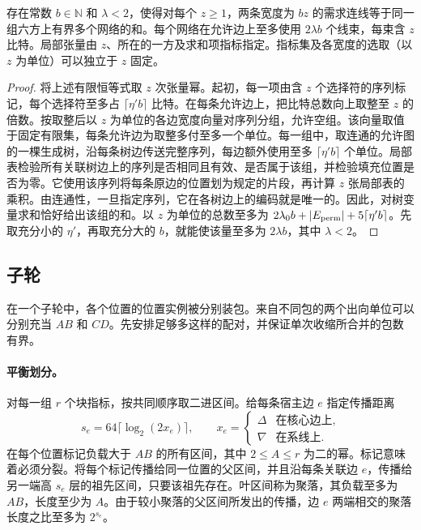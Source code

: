 \begin{lemma}[宽度的固定选择]\label{lem:powered-gadget} 存在常数 $b\in\mathbb N$ 和 $\lambda<2$，使得对每个 $z\ge1$，两条宽度为 $bz$ 的需求连线等于同一组六方上有界多个网络的和。每个网络在允许边上至多使用 $2\lambda b$ 个线束，每束含 $z$ 比特。局部张量由 $z$、所在的一方及求和项指标指定。指标集及各宽度的选取（以 $z$ 为单位）可以独立于 $z$ 固定。\end{lemma}

\begin{proof} 将上述有限恒等式取 $z$ 次张量幂。起初，每一项由含 $z$ 个选择符的序列标记，每个选择符至多占 $\lceil\eta'b\rceil$ 比特。在每条允许边上，把比特总数向上取整至 $z$ 的倍数。按取整后以 $z$ 为单位的各边宽度向量对序列分组，允许空组。该向量取值于固定有限集，每条允许边为取整多付至多一个单位。每一组中，取连通的允许图的一棵生成树，沿每条树边传送完整序列，每边额外使用至多 $\lceil\eta'b\rceil$ 个单位。局部表检验所有关联树边上的序列是否相同且有效、是否属于该组，并检验填充位置是否为零。它使用该序列将每条原边的位置划为规定的片段，再计算 $z$ 张局部表的乘积。由连通性，一旦指定序列，它在各树边上的编码就是唯一的。因此，对树变量求和恰好给出该组的和。以 $z$ 为单位的总数至多为 $2\lambda_0 b+|E_{\rm perm}|+5\lceil\eta'b\rceil$。先取充分小的 $\eta'$，再取充分大的 $b$，就能使该量至多为 $2\lambda b$，其中 $\lambda<2$。\end{proof}

\subsection{子轮} 在一个子轮中，各个位置的位置实例被分别装包。来自不同包的两个出向单位可以分别充当 \(AB\) 和 \(CD\)。先安排足够多这样的配对，并保证单次收缩所合并的包数有界。

\paragraph{平衡划分。} 对每一组 \(r\) 个块指标，按共同顺序取二进区间。给每条宿主边 \(e\) 指定传播距离 \[
 s_e=64\lceil\log_2(2x_e)\rceil,\qquad
 x_e=\begin{cases}\Delta&\text{在核心边上},\\
                     \nabla&\text{在系线上}.\end{cases}
\] 在每个位置标记负载大于 \(AB\) 的所有区间，其中 \(2\le A\le r\) 为二的幂。标记意味着必须分裂。将每个标记传播给同一位置的父区间，并且沿每条关联边 \(e\)，传播给另一端高 \(s_e\) 层的祖先区间，只要该祖先存在。叶区间称为聚落，其负载至多为 \(AB\)，长度至少为 \(A\)。由于较小聚落的父区间所发出的传播，边 \(e\) 两端相交的聚落长度之比至多为 \(2^{s_e}\)。

